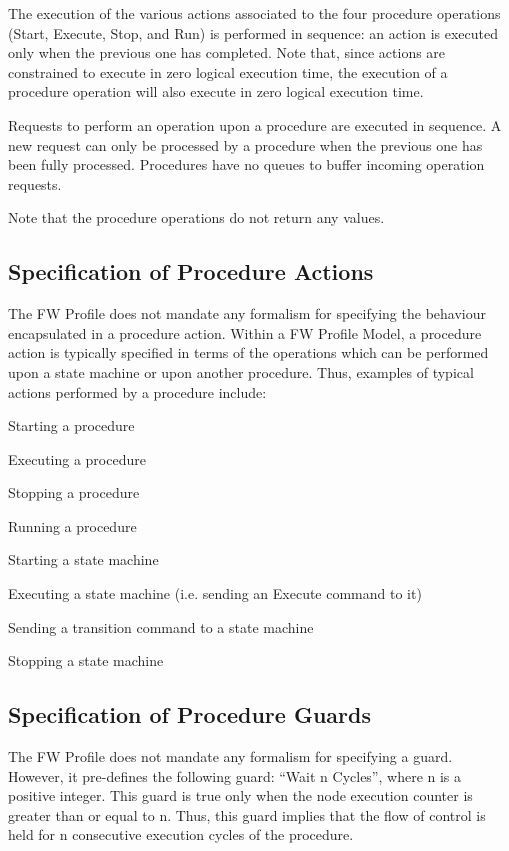 \documentclass[a4paper,10pt]{article}
\newenvironment{fw_itemize}						%
{\begin{itemize}
  \setlength{\itemsep}{1mm}
  \setlength{\parskip}{0pt}
  \setlength{\parsep}{0pt}}
{\end{itemize}}
\begin{document}
The execution of the various actions associated to the four procedure operations (Start,
Execute, Stop, and Run) is performed in sequence: an action is executed only when the
previous one has completed. Note that, since actions are constrained to execute in zero logical execution
time, the execution of a procedure operation will also execute in zero logical execution time.

Requests to perform an operation upon a procedure are executed in sequence. A new request
can only be processed by a procedure when the previous one has been fully processed.
Procedures have no queues to buffer incoming operation requests.

Note that the procedure operations do not return any values.


\subsection{Specification of Procedure Actions}\label{sec:specProcActions} 
The FW Profile does not mandate any formalism for specifying the behaviour encapsulated in a procedure action. Within a FW Profile Model, a procedure action is typically specified in
terms of the operations which can be performed upon a state machine or upon another procedure.
Thus, examples of typical actions performed by a procedure include:

\begin{fw_itemize} 
\item Starting a procedure
\item Executing a procedure
\item Stopping a procedure
\item Running a procedure
\item Starting a state machine
\item Executing a state machine (i.e. sending an Execute command to it)
\item Sending a transition command to a state machine 
\item Stopping a state machine
\end{fw_itemize}

\subsection{Specification of Procedure Guards}
The FW Profile does not mandate any formalism for specifying a guard. However, it
pre-defines the following guard: “Wait n Cycles”, where n is a positive integer. This guard 
is true only when the node execution counter is greater than or equal to n. 
Thus, this guard implies that the flow of control is held for n
consecutive execution cycles of the procedure.
\end{document}
